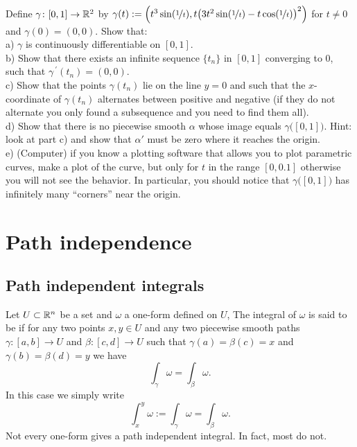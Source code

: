 \begin{samepage}
\begin{exercise}
Define $\gamma \colon [0,1] \to {\mathbb{R}}^2$ by
$\gamma(t) := \Bigl( t^3 \sin(\nicefrac{1}{t}),
t{\bigl(3t^2\sin(\nicefrac{1}{t})-t\cos(\nicefrac{1}{t})\bigr)}^2 \Bigr)$
for
$t \not= 0$ and $\gamma(0) = (0,0)$.  Show that:\\
a) $\gamma$ is continuously differentiable on $[0,1]$.\\
b) Show that there exists an infinite sequence $\{ t_n \}$ in $[0,1]$
converging to 0, such that
$\gamma^{\:\prime}(t_n) = (0,0)$. \\
c) Show that the points $\gamma(t_n)$ lie on the line $y=0$ and such
that the $x$-coordinate of $\gamma(t_n)$ alternates between positive and
negative (if they do not alternate you only found a subsequence
and you need to find them all).\\
d) Show that there is no piecewise smooth $\alpha$ whose image equals
$\gamma\bigl([0,1]\bigr)$.  Hint: look at part c) and show that $\alpha'$
must be zero where it reaches the origin.
\\
e) (Computer) if you know a plotting software that allows you to plot
parametric curves, make a plot of the curve, but only for $t$ in the
range $[0,0.1]$ otherwise you will not see the behavior.  In particular, you
should notice that $\gamma\bigl([0,1]\bigr)$ has infinitely many ``corners''
near the origin.
\end{exercise}
\end{samepage}


\sectionnewpage
\section{Path independence}
\label{sec:pathind}


\subsection{Path independent integrals}

Let $U \subset {\mathbb{R}}^n$ be a set and $\omega$ a one-form defined on $U$,
The integral of $\omega$
is said to be \emph{}
if for any two points $x,y \in U$ and
any two piecewise smooth paths
$\gamma \colon [a,b] \to U$ and
$\beta \colon [c,d] \to U$ such that $\gamma(a) = \beta(c) = x$
and $\gamma(b) = \beta(d) = y$ we have
\begin{equation*}
\int_\gamma \omega = \int_\beta \omega .
\end{equation*}
In this case we simply write
\begin{equation*}
\int_x^y \omega := \int_\gamma \omega = \int_\beta \omega .
\end{equation*}
Not every one-form gives a path independent integral.  In fact, most do not.

